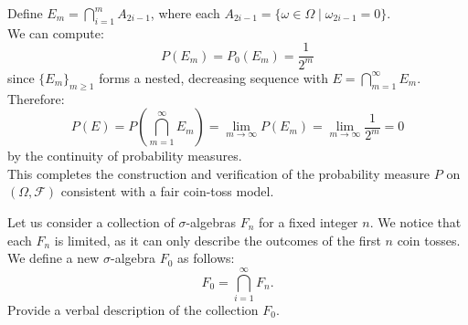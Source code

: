 Define \( E_m = \bigcap_{i=1}^m A_{2i-1} \), where each \( A_{2i-1} = \{\omega \in \Omega \mid \omega_{2i-1} = 0\} \).\\

We can compute:
  \[
  P(E_m) = P_0(E_m) = \frac{1}{2^m}
  \]
since \( \{E_m\}_{m \geq 1} \) forms a nested, decreasing sequence with \( E = \bigcap_{m=1}^{\infty} E_m \).\\

Therefore:
  \[
  P(E) = P\left(\bigcap_{m=1}^{\infty} E_m\right) = \lim_{m \to \infty} P(E_m) = \lim_{m \to \infty} \frac{1}{2^m} = 0
  \]
by the continuity of probability measures.\\

This completes the construction and verification of the probability measure \( P \) on \( (\Omega, \mathcal{F}) \) consistent with a fair coin-toss model.\\

\begin{exercise}
    Let us consider a collection of $\sigma$-algebras \( F_n \) for a fixed integer \( n \). We notice that each \( F_n \) is limited, as it can only describe the outcomes of the first \( n \) coin tosses. We define a new $\sigma$-algebra \( F_0 \) as follows:
\[
F_0 = \bigcap_{i=1}^{\infty} F_n.
\]
Provide a verbal description of the collection \( F_0 \).
\end{exercise}

